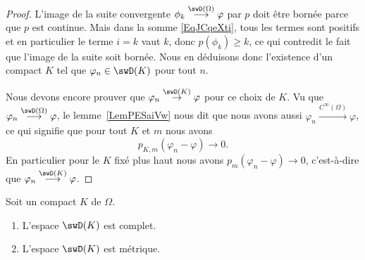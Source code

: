 \begin{proof}
    L'image de la suite convergente \( \phi_k\stackrel{\swD(\Omega)}{\longrightarrow}\varphi\) par \( p\) doit être bornée parce que \( p\) est continue. Mais dans la somme  \eqref{EqJCqeXti}, tous les termes sont positifs et en particulier le terme \( i=k\) vaut \( k\), donc \( p(\phi_k)\geq k\), ce qui contredit le fait que l'image de la suite soit bornée. Nous en déduisons donc l'existence d'un compact \( K\) tel que \( \varphi_n\in \swD(K)\) pour tout \( n\).

    Nous devons encore prouver que \( \varphi_n\stackrel{\swD(K)}{\to}\varphi\) pour ce choix de \( K\). Vu que \( \varphi_n\stackrel{\swD(\Omega)}{\longrightarrow}\varphi\), le lemme~\ref{LemPESaiVw} nous dit que nous avons aussi \( \varphi_n\stackrel{ C^{\infty}(\Omega)}{\longrightarrow}\varphi\), ce qui signifie que pour tout \( K\) et \( m\) nous avons
    \begin{equation}
        p_{K,m}(\varphi_n-\varphi)\to 0.
    \end{equation}
    En particulier pour le \( K\) fixé plus haut nous avons \( p_m(\varphi_n-\varphi)\to 0\), c'est-à-dire que \( \varphi_n\stackrel{\swD(K)}{\longrightarrow}\varphi\).

\end{proof}


\begin{proposition} \label{PropQAEVcTi}
    Soit un compact \( K\) de \( \Omega\).
    \begin{enumerate}
        \item
           L'espace \( \swD(K)\) est complet.
        \item
            L'espace \( \swD(K)\) est métrique.
    \end{enumerate}
\end{proposition}

